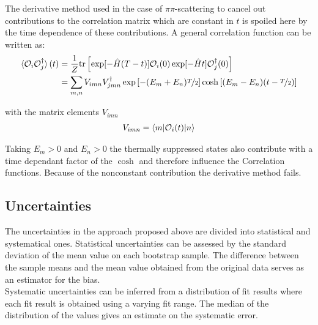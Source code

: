 \documentclass[12pt,a4paper]{scrartcl}
\begin{document}
The derivative method used in the case of $\pi\pi$-scattering to cancel out
contributions to the correlation matrix which are constant in $t$ is spoiled
here by the time dependence of these contributions. A general correlation
function can be written as:
\begin{align}
  \braket{\mathcal{O}_i \mathcal{O}^{\dag}_j}(t) &= \frac{1}{Z}
 \text{tr} \left[ \exp[-\hat{H}(T-t)]\mathcal{O}_i(0)\exp[-\hat{H}t]\mathcal{O}^{\dag}_j(0)
  \right] \\
  &= \sum_{m,n} V_{imn}V^{\dag}_{jmn}\exp \left[ -(E_m+E_n)\nicefrac{T}{2} \right]
  \cosh \left[ (E_m-E_n)(t-\nicefrac{T}{2}) \right] 
\end{align}

with the matrix elements $V_{imn}$
\begin{align}
  V_{imn} = \braket{m|\mathcal{O}_i(t)|n}
\end{align}

Taking $E_m > 0$ and $E_n > 0$ the thermally suppressed states also contribute
with a time dependant factor of the $\cosh$ and therefore influence the
Correlation functions. Because of the nonconstant contribution the derivative
method fails.

\subsection{Uncertainties}
The uncertainties in the approach proposed above are divided into statistical
and systematical ones. Statistical uncertainties can be assessed by the standard
deviation of the mean value on each bootstrap sample. The difference between the
sample means and the mean value obtained from the original data serves as an
estimator for the bias.\\
Systematic uncertainties can be inferred from a distribution of fit results
where each fit result is obtained using a varying fit range. The median of the
distribution of the values gives an estimate on the systematic error.
\end{document}
